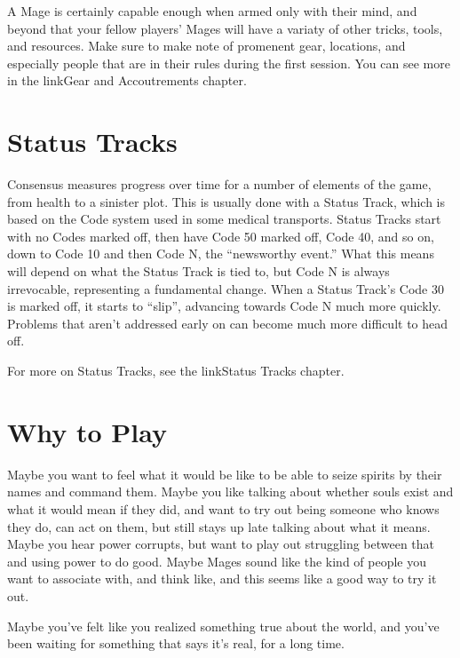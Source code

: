 \documentclass[
  oneside,
  statementpaper,
  9pt]{memoir}
\begin{document}
\begin{MC}

A Mage is certainly capable enough when armed only with their mind, and beyond that your fellow players' Mages will have a variaty of other tricks, tools, and resources. Make sure to make note of promenent gear, locations, and especially people that are in their rules during the first session. You can see more in the {{linkGear and Accoutrements chapter}}.

\end{MC}

\hypertarget{status-tracks}{%
\section{Status Tracks}\label{status-tracks}}

\begin{Narrator}

Consensus measures progress over time for a number of elements of the game, from health to a sinister plot. This is usually done with a Status Track, which is based on the Code system used in some medical transports. Status Tracks start with no Codes marked off, then have Code 50 marked off, Code 40, and so on, down to Code 10 and then Code N, the “newsworthy event.” What this means will depend on what the Status Track is tied to, but Code N is always irrevocable, representing a fundamental change. When a Status Track’s Code 30 is marked off, it starts to “slip”, advancing towards Code N much more quickly. Problems that aren’t addressed early on can become much more difficult to head off.

For more on Status Tracks, see the {{linkStatus Tracks chapter}}.

\end{Narrator}

\hypertarget{why-to-play}{%
\section{Why to Play}\label{why-to-play}}

\begin{Narrator}

Maybe you want to feel what it would be like to be able to seize spirits by their names and command them. Maybe you like talking about whether souls exist and what it would mean if they did, and want to try out being someone who knows they do, can act on them, but still stays up late talking about what it means. Maybe you hear power corrupts, but want to play out struggling between that and using power to do good. Maybe Mages sound like the kind of people you want to associate with, and think like, and this seems like a good way to try it out.

Maybe you’ve felt like you realized something true about the world, and you’ve been waiting for something that says it’s real, for a long time.

\end{Narrator}
\end{document}
